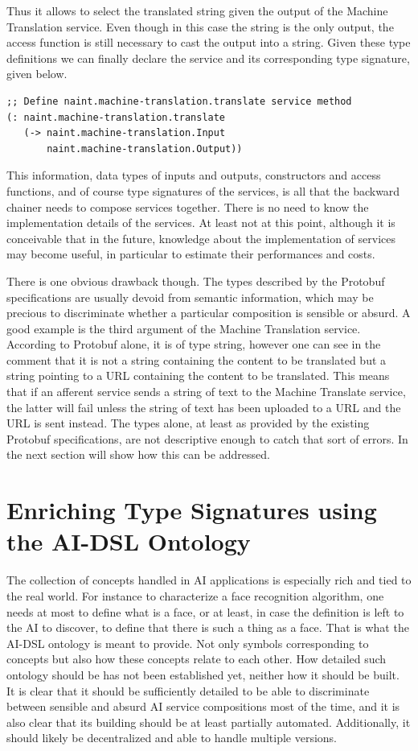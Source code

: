 \documentclass[]{report}
\begin{document}
Thus it allows to select the translated string given the output of the
Machine Translation service.  Even though in this case the string is
the only output, the access function is still necessary to cast the
output into a string.  Given these type definitions we can finally
declare the service and its corresponding type signature, given below.
\begin{verbatim}
;; Define naint.machine-translation.translate service method
(: naint.machine-translation.translate
   (-> naint.machine-translation.Input
       naint.machine-translation.Output))
\end{verbatim}
This information, data types of inputs and outputs, constructors and
access functions, and of course type signatures of the services, is
all that the backward chainer needs to compose services together.
There is no need to know the implementation details of the services.
At least not at this point, although it is conceivable that in the
future, knowledge about the implementation of services may become
useful, in particular to estimate their performances and costs.

There is one obvious drawback though.  The types described by the
Protobuf specifications are usually devoid from semantic information,
which may be precious to discriminate whether a particular composition
is sensible or absurd.  A good example is the third argument of the
Machine Translation service.  According to Protobuf alone, it is of
type string, however one can see in the comment that it is not a
string containing the content to be translated but a string pointing
to a URL containing the content to be translated.  This means that if
an afferent service sends a string of text to the Machine Translate
service, the latter will fail unless the string of text has been
uploaded to a URL and the URL is sent instead.  The types alone, at
least as provided by the existing Protobuf specifications, are not
descriptive enough to catch that sort of errors.  In the next section
will show how this can be addressed.
\section{Enriching Type Signatures using the AI-DSL Ontology}
\label{sec:ontology}
The collection of concepts handled in AI applications is especially
rich and tied to the real world.  For instance to characterize a face
recognition algorithm, one needs at most to define what is a face, or
at least, in case the definition is left to the AI to discover, to
define that there is such a thing as a face.  That is what the AI-DSL
ontology is meant to provide.  Not only symbols corresponding to
concepts but also how these concepts relate to each other.  How
detailed such ontology should be has not been established yet, neither
how it should be built.  It is clear that it should be sufficiently
detailed to be able to discriminate between sensible and absurd AI
service compositions most of the time, and it is also clear that its
building should be at least partially automated.  Additionally, it
should likely be decentralized and able to handle multiple versions.
\end{document}
